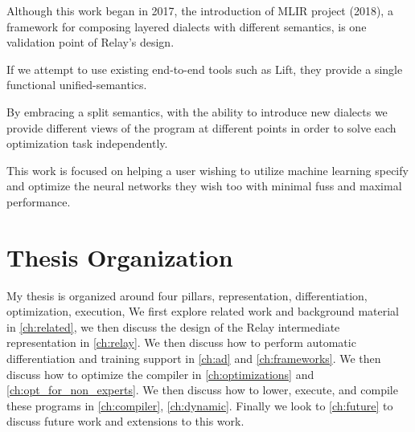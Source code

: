 Although this work began in 2017, the introduction of MLIR project (2018), a framework for composing layered dialects with different semantics,
is one validation point of Relay’s design.

If we attempt to use existing end-to-end tools such as Lift, they provide a single functional unified-semantics.

By embracing a split semantics, with the ability to introduce new dialects we provide different views of the program at different points in order to solve each optimization task independently.

This work is focused on helping a user wishing to utilize machine learning specify and optimize
  the neural networks they wish too with minimal fuss and maximal performance.

\section{Thesis Organization}

My thesis is organized around four pillars, representation, differentiation, optimization, execution,
We first explore related work and background material
  in \ref{ch:related}, we then discuss the design of the Relay intermediate representation in \ref{ch:relay}.
We then discuss how to perform automatic differentiation and training support in \ref{ch:ad} and
  \ref{ch:frameworks}.
We then discuss how to optimize the compiler in \ref{ch:optimizations} and \ref{ch:opt_for_non_experts}.
We then discuss how to lower, execute, and compile these programs in
\ref{ch:compiler}, \ref{ch:dynamic}.
Finally we look to \ref{ch:future} to discuss future work and extensions to this work.






